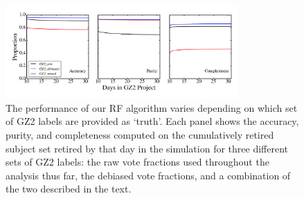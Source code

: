 \documentclass[twocolumn]{aastex6}
\begin{document}

\begin{figure}[t!]
\includegraphics[width=3.5in]{figures/GZ2_sup_PLPD5_p5_flipfeature2b_RF_accuracy_redo_raw_combo_machine_metrics_comparison.png}
\caption{The performance of our RF algorithm varies depending on which set of GZ2 labels are provided as `truth'. Each panel shows the accuracy, purity, and completeness computed on the cumulatively retired subject set retired by that day in the simulation for three different sets of GZ2 labels: the raw vote fractions used throughout the analysis thus far, the debiased vote fractions, and a combination of the two described in the text. \label{fig: machine metrics}}
\end{figure}
\end{document}
